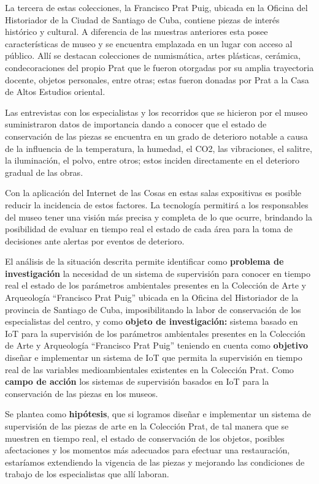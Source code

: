     La tercera de estas colecciones, la Francisco Prat Puig, ubicada en la Oficina del Historiador de la Ciudad de Santiago de Cuba, contiene piezas de interés histórico y cultural. A diferencia de las muestras anteriores esta posee características de museo y se encuentra emplazada en un lugar con acceso al público. Allí se destacan colecciones de numismática, artes plásticas, cerámica, condecoraciones del propio Prat que le fueron otorgadas por su amplia trayectoria docente, objetos personales, entre otras; estas fueron donadas por Prat a la Casa de Altos Estudios oriental.

    Las entrevistas con los especialistas y los recorridos que se hicieron por el museo suministraron datos de importancia dando a conocer que el estado de conservación de las piezas se encuentra en un grado de deterioro notable a causa de la influencia de la temperatura, la humedad, el CO2, las vibraciones, el salitre, la iluminación, el polvo, entre otros; estos inciden directamente en el deterioro gradual de las obras.
    
    Con la aplicación del Internet de las Cosas en estas salas expositivas es posible reducir la incidencia de estos factores. La tecnología permitirá a los responsables del museo tener una visión más precisa y completa de lo que ocurre, brindando la posibilidad de evaluar en tiempo real el estado de cada área para la toma de decisiones ante alertas por eventos de deterioro.
    
    El análisis de la situación descrita permite identificar como \textbf{problema de investigación} la necesidad de un sistema de supervisión para conocer en tiempo real el estado de los parámetros ambientales presentes en la Colección de Arte y Arqueología “Francisco Prat Puig” ubicada en la Oficina del Historiador de la provincia de Santiago de Cuba, imposibilitando la labor de conservación de los especialistas del centro, y como
    \textbf{objeto de investigación:} sistema basado en IoT para la supervisión de los parámetros ambientales presentes en la Colección de Arte y Arqueología “Francisco Prat Puig” teniendo en cuenta como \textbf{objetivo} diseñar e implementar un sistema de IoT que permita la supervisión en tiempo real de las variables medioambientales existentes en la Colección Prat. Como \textbf{campo de acción} los sistemas de supervisión basados en IoT para la conservación de las piezas en los museos.

    Se plantea como \textbf{hipótesis}, que si logramos diseñar e implementar un sistema de supervisión de las piezas de arte en la Colección Prat, de tal manera que se muestren en tiempo real, el estado de conservación de los objetos, posibles afectaciones y los momentos más adecuados para efectuar una restauración, estaríamos extendiendo la vigencia de las piezas  y mejorando las condiciones de trabajo de los especialistas que allí laboran.\\
    
